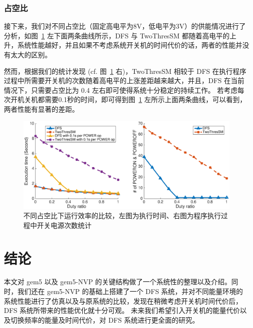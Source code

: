 \documentclass[a4paper,titlepage]{report}
\begin{document}
\subsubsection{占空比}
接下来，我们对不同占空比（固定高电平为8V，低电平为3V）的供能情况进行了分析，如图~\ref{duty} 左下面两条曲线所示，DFS 与 TwoThresSM 都随着高电平的上升，系统性能越好，并且如果不考虑系统开关机的时间代价的话，两者的性能并没有太大的区别。

然而，根据我们的统计发现 (cf. 图~\ref{duty} 右)，TwoThresSM 相较于 DFS 在执行程序过程中所需要开关机的次数随着高电平的上涨差距越来越大，并且，DFS 在当前情况下，只需要占空比为 0.4 左右即可使得系统十分稳定的持续工作。
若考虑每次开机关机都需要0.1秒的时间，即可得到图~\ref{duty} 左所示上面两条曲线，可以看到，两者性能有显著的差距。
\begin{figure}[!htbp]
\centering
\includegraphics[width = 5.5in]{duty.eps}
\caption{不同占空比下运行效率的比较，左图为执行时间、右图为程序执行过程中开关电源次数统计}
\label{duty}
\end{figure}


\section{结论} \label{sec:conclusion}
本文对 gem5 以及 gem5-NVP 的关键结构做了一个系统性的整理以及介绍。同时，我们还在 gem5-NVP 的基础上搭建了一个 DFS 系统，并对不同能量环境的系统性能进行了仿真以及与原系统的比较，发现在稍微考虑开关机时间代价后，DFS 系统所带来的性能优化就十分可观。
未来我们希望引入开关机的能量代价以及切换频率的能量及时间代价，对 DFS 系统进行更全面的研究。



\end{document}
